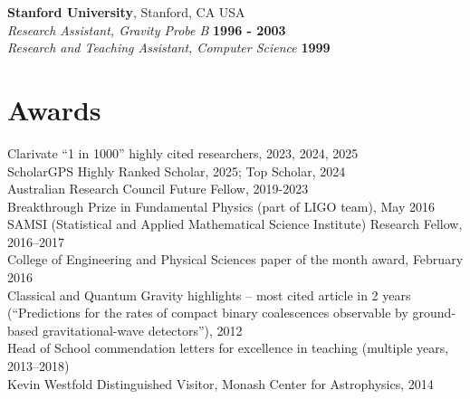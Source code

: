 \documentclass[margin,line]{res}
\begin{document}
\begin{resume}
{\bf Stanford University}, Stanford, CA USA\\
\vspace*{.02in}
{\em Research Assistant, Gravity Probe B} \hfill {\bf 1996 - 2003}\\
\vspace*{.02in}
{\em Research and Teaching Assistant, Computer Science} \hfill {\bf 1999}


\section{\sc Awards} 
Clarivate “1 in 1000” highly cited researchers, 2023, 2024, 2025\\
ScholarGPS Highly Ranked Scholar, 2025; Top Scholar, 2024\\
Australian Research Council Future Fellow, 2019-2023\\
Breakthrough Prize in Fundamental Physics (part of LIGO team), May 2016\\
SAMSI (Statistical and Applied Mathematical Science Institute) Research Fellow, 2016--2017\\
College of Engineering and Physical Sciences paper of the month award, February 2016\\
Classical and Quantum Gravity highlights -- most cited article in 2 years (``Predictions for the rates of compact binary coalescences observable by ground-based gravitational-wave detectors''), 2012\\
Head of School commendation letters for excellence in teaching (multiple years, 2013--2018)\\
Kevin Westfold Distinguished Visitor, Monash Center for Astrophysics, 2014\\



\end{resume}
\end{document}
